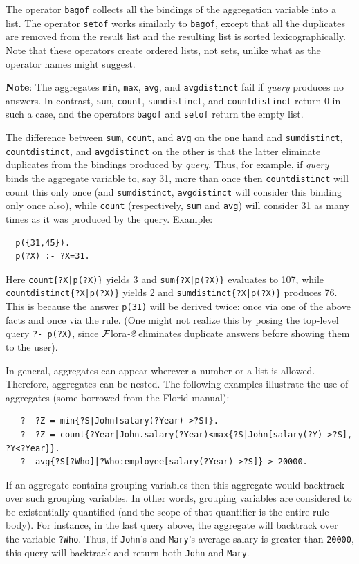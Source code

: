 \documentclass[11pt]{article}
\newcommand{\FLORA}{{\mbox{\sc ${\cal F}${lora}\rm\emph{-2}}}\xspace}
\newcommand{\FLSYSTEM}{\FLORA}
\newcommand{\FLORID}{{\mbox{\sc Florid}}\xspace}
\begin{document}
The operator {\tt bagof} collects all the bindings of
the aggregation variable into a list. The operator {\tt setof} works
similarly to {\tt bagof}, except that all the duplicates are removed
from the result list and the resulting list is sorted lexicographically.
Note that these operators create ordered lists, not sets, unlike what
as the operator names might suggest.


\textbf{Note}: 
The aggregates {\tt min}, {\tt max}, {\tt avg}, and \texttt{avgdistinct}  
fail if \emph{query}  produces no answers.
In contrast, \texttt{sum}, \texttt{count}, \texttt{sumdistinct}, and
\texttt{countdistinct} return 0 in such a case, and the operators
{\tt bagof} and {\tt setof}
return the empty list.

The difference between \texttt{sum}, \texttt{count}, and \texttt{avg} on
the one hand and \texttt{sumdistinct}, \texttt{countdistinct}, and
\texttt{avgdistinct} on the other is that the latter eliminate duplicates
from the bindings produced by \textit{query}. Thus, for example, if
\textit{query} binds the aggregate variable to, say 31, more than once then
\texttt{countdistinct} will count this only once (and \texttt{sumdistinct},
\texttt{avgdistinct} will consider this binding only once also), while   
\texttt{count} (respectively, \texttt{sum} and \texttt{avg}) will consider    
31 as many times as it was produced by the query. Example:
\begin{verbatim}
  p({31,45}).
  p(?X) :- ?X=31.
\end{verbatim}
Here \texttt{count\{?X|p(?X)\}} yields 3 and \texttt{sum\{?X|p(?X)\}}
evaluates to 107, while \texttt{countdistinct\{?X|p(?X)\}} yields 2 and
\texttt{sumdistinct\{?X|p(?X)\}} produces 76.  This is because the answer
\texttt{p(31)} will be derived twice: once via one of the above facts and
once via the rule. (One might not realize this by posing the top-level
query \texttt{?- p(?X)}, since \FLSYSTEM eliminates duplicate answers
before showing them to the user).

In general, aggregates can appear wherever a number or a list is
allowed. Therefore, aggregates can be nested. The following examples
illustrate the use of aggregates (some borrowed from the \FLORID manual):
\begin{verbatim}
   ?- ?Z = min{?S|John[salary(?Year)->?S]}.
   ?- ?Z = count{?Year|John.salary(?Year)<max{?S|John[salary(?Y)->?S], ?Y<?Year}}.
   ?- avg{?S[?Who]|?Who:employee[salary(?Year)->?S]} > 20000. 
\end{verbatim}
If an aggregate contains grouping variables 
then this aggregate would backtrack over such
grouping variables. In other words, grouping variables are considered to be
existentially quantified (and the scope of that quantifier is
the entire rule body).
For instance, in the last query above, the
aggregate will backtrack over the variable {\tt ?Who}. Thus, if
{\tt John}'s and {\tt Mary}'s average salary is greater than {\tt 20000},
this query will backtrack and return both {\tt John} and {\tt Mary}.
\end{document}
